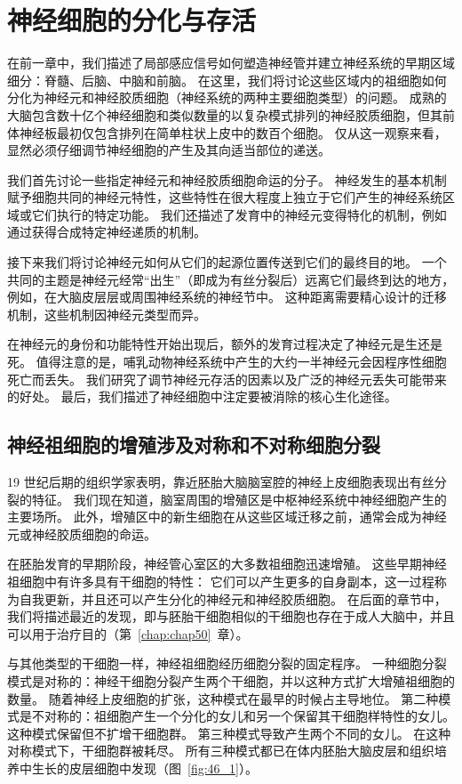 \chapter{神经细胞的分化与存活} \label{chap:chap46}


在前一章中，我们描述了局部感应信号如何塑造神经管并建立神经系统的早期区域细分：脊髓、后脑、中脑和前脑。
在这里，我们将讨论这些区域内的祖细胞如何分化为神经元和神经胶质细胞（神经系统的两种主要细胞类型）的问题。
成熟的大脑包含数十亿个神经细胞和类似数量的以复杂模式排列的神经胶质细胞，但其前体神经板最初仅包含排列在简单柱状上皮中的数百个细胞。
仅从这一观察来看，显然必须仔细调节神经细胞的产生及其向适当部位的递送。


我们首先讨论一些指定神经元和神经胶质细胞命运的分子。
神经发生的基本机制赋予细胞共同的神经元特性，这些特性在很大程度上独立于它们产生的神经系统区域或它们执行的特定功能。
我们还描述了发育中的神经元变得特化的机制，例如通过获得合成特定神经递质的机制。


接下来我们将讨论神经元如何从它们的起源位置传送到它们的最终目的地。
一个共同的主题是神经元经常“出生”（即成为有丝分裂后）远离它们最终到达的地方，例如，在大脑皮层层或周围神经系统的神经节中。
这种距离需要精心设计的迁移机制，这些机制因神经元类型而异。


在神经元的身份和功能特性开始出现后，额外的发育过程决定了神经元是生还是死。
值得注意的是，哺乳动物神经系统中产生的大约一半神经元会因程序性细胞死亡而丢失。
我们研究了调节神经元存活的因素以及广泛的神经元丢失可能带来的好处。
最后，我们描述了神经细胞中注定要被消除的核心生化途径。



\section{神经祖细胞的增殖涉及对称和不对称细胞分裂}

19 世纪后期的组织学家表明，靠近胚胎大脑脑室腔的神经上皮细胞表现出有丝分裂的特征。
我们现在知道，脑室周围的增殖区是中枢神经系统中神经细胞产生的主要场所。
此外，增殖区中的新生细胞在从这些区域迁移之前，通常会成为神经元或神经胶质细胞的命运。


在胚胎发育的早期阶段，神经管心室区的大多数祖细胞迅速增殖。
这些早期神经祖细胞中有许多具有干细胞的特性：
它们可以产生更多的自身副本，这一过程称为自我更新，并且还可以产生分化的神经元和神经胶质细胞。
在后面的章节中，我们将描述最近的发现，即与胚胎干细胞相似的干细胞也存在于成人大脑中，并且可以用于治疗目的（第~\ref{chap:chap50}~章）。


与其他类型的干细胞一样，神经祖细胞经历细胞分裂的固定程序。
一种细胞分裂模式是对称的：神经干细胞分裂产生两个干细胞，并以这种方式扩大增殖祖细胞的数量。
随着神经上皮细胞的扩张，这种模式在最早的时候占主导地位。
第二种模式是不对称的：祖细胞产生一个分化的女儿和另一个保留其干细胞样特性的女儿。
这种模式保留但不扩增干细胞群。
第三种模式导致产生两个不同的女儿。
在这种对称模式下，干细胞群被耗尽。
所有三种模式都已在体内胚胎大脑皮层和组织培养中生长的皮层细胞中发现（图~\ref{fig:46_1}）。


